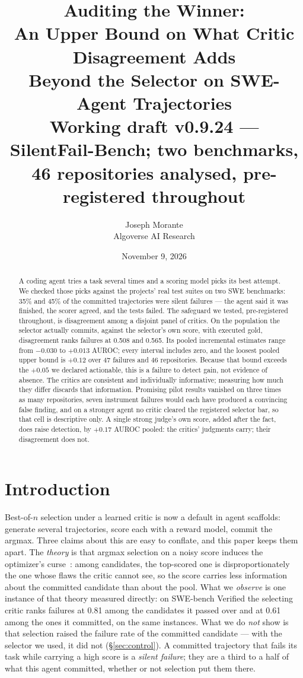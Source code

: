 \documentclass[11pt]{article}
\title{\textbf{Auditing the Winner:\\[2pt] An Upper Bound on What Critic Disagreement Adds\\ Beyond the Selector on SWE-Agent Trajectories}\\[6pt]
\normalsize\textnormal{Working draft v0.9.24 --- SilentFail-Bench; two benchmarks, 46 repositories analysed, pre-registered throughout}}
\author{Joseph Morante\\ \small Algoverse AI Research}
\date{\small November 9, 2026}
\begin{document}
\maketitle

\begin{abstract}
A coding agent tries a task several times and a scoring model picks its best attempt. We checked those picks against the projects' real test suites on two SWE benchmarks: 35\% and 45\% of the committed trajectories were silent failures --- the agent said it was finished, the scorer agreed, and the tests failed. The safeguard we tested, pre-registered throughout, is disagreement among a disjoint panel of critics. On the population the selector actually commits, against the selector's own score, with executed gold, disagreement ranks failures at 0.508 and 0.565. Its pooled incremental estimates range from $-0.030$ to $+0.013$ AUROC; every interval includes zero, and the loosest pooled upper bound is $+0.12$ over 47 failures and 46 repositories. Because that bound exceeds the $+0.05$ we declared actionable, this is a failure to detect gain, not evidence of absence. The critics are consistent and individually informative; measuring how much they differ discards that information. Promising pilot results vanished on three times as many repositories, seven instrument failures would each have produced a convincing false finding, and on a stronger agent no critic cleared the registered selector bar, so that cell is descriptive only. A single strong judge's own score, added after the fact, does raise detection, by $+0.17$ AUROC pooled: the critics' judgments carry; their disagreement does not.
\end{abstract}

\section{Introduction}
Best-of-$n$ selection under a learned critic is now a default in agent scaffolds: generate several trajectories, score each with a reward model, commit the argmax. Three claims about this are easy to conflate, and this paper keeps them apart. The \emph{theory} is that argmax selection on a noisy score induces the optimizer's curse~\citep{smith2006optimizer}: among candidates, the top-scored one is disproportionately the one whose flaws the critic cannot see, so the score carries less information about the committed candidate than about the pool. What we \emph{observe} is one instance of that theory measured directly: on SWE-bench Verified the selecting critic ranks failures at 0.81 among the candidates it passed over and at 0.61 among the ones it committed, on the same instances. What we do \emph{not} show is that selection raised the failure rate of the committed candidate --- with the selector we used, it did not (\S\ref{sec:control}). A committed trajectory that fails its task while carrying a high score is a \emph{silent failure}; they are a third to a half of what this agent committed, whether or not selection put them there.
\end{document}
